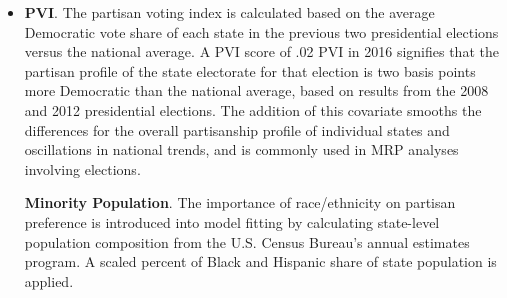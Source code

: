 \begin{itemize}

\item \textbf{PVI}. The partisan voting index is calculated based on the average Democratic vote share of each state in the previous two presidential elections versus the national average. A PVI score of .02 PVI in 2016 signifies that the partisan profile of the state electorate for that election is two basis points more Democratic than the national average, based on results from the 2008 and 2012 presidential elections. The addition of this covariate smooths the differences for the overall partisanship profile of individual states and oscillations in national trends, and is commonly used in MRP analyses involving elections. 

\textbf{Minority Population}. The importance of race/ethnicity on partisan preference is introduced into model fitting by calculating state-level population composition from the U.S. Census Bureau's annual estimates program. A scaled percent of Black and Hispanic share of state population is applied. 



\end{itemize}
